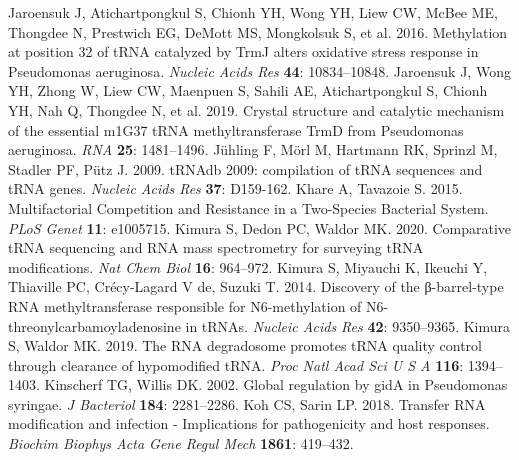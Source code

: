 \documentclass[times, twoside]{zHenriquesLab-StyleBioRxiv}
\begin{document}
Jaroensuk J, Atichartpongkul S, Chionh YH, Wong YH, Liew CW, McBee ME, Thongdee N, Prestwich EG, DeMott MS, Mongkolsuk S, et al. 2016. Methylation at position 32 of tRNA catalyzed by TrmJ alters oxidative stress response in Pseudomonas aeruginosa. \textit{Nucleic Acids Res} \textbf{44}: 10834–10848. 
\newline
\newline
Jaroensuk J, Wong YH, Zhong W, Liew CW, Maenpuen S, Sahili AE, Atichartpongkul S, Chionh YH, Nah Q, Thongdee N, et al. 2019. Crystal structure and catalytic mechanism of the essential m1G37 tRNA methyltransferase TrmD from Pseudomonas aeruginosa. \textit{RNA} \textbf{25}: 1481–1496. 
\newline
\newline
Jühling F, Mörl M, Hartmann RK, Sprinzl M, Stadler PF, Pütz J. 2009. tRNAdb 2009: compilation of tRNA sequences and tRNA genes. \textit{Nucleic Acids Res} \textbf{37}: D159-162. 
\newline
\newline
Khare A, Tavazoie S. 2015. Multifactorial Competition and Resistance in a Two-Species Bacterial System. \textit{PLoS Genet} \textbf{11}: e1005715. 
\newline
\newline
Kimura S, Dedon PC, Waldor MK. 2020. Comparative tRNA sequencing and RNA mass spectrometry for surveying tRNA modifications. \textit{Nat Chem Biol} \textbf{16}: 964–972. 
\newline
\newline
Kimura S, Miyauchi K, Ikeuchi Y, Thiaville PC, Crécy-Lagard V de, Suzuki T. 2014. Discovery of the β-barrel-type RNA methyltransferase responsible for N6-methylation of N6-threonylcarbamoyladenosine in tRNAs. \textit{Nucleic Acids Res} \textbf{42}: 9350–9365. 
\newline
\newline
Kimura S, Waldor MK. 2019. The RNA degradosome promotes tRNA quality control through clearance of hypomodified tRNA. \textit{Proc Natl Acad Sci U S A} \textbf{116}: 1394–1403. 
\newline
\newline
Kinscherf TG, Willis DK. 2002. Global regulation by gidA in Pseudomonas syringae. \textit{J Bacteriol} \textbf{184}: 2281–2286. 
\newline
\newline
Koh CS, Sarin LP. 2018. Transfer RNA modification and infection - Implications for pathogenicity and host responses. \textit{Biochim Biophys Acta Gene Regul Mech} \textbf{1861}: 419–432. 
\end{document}
